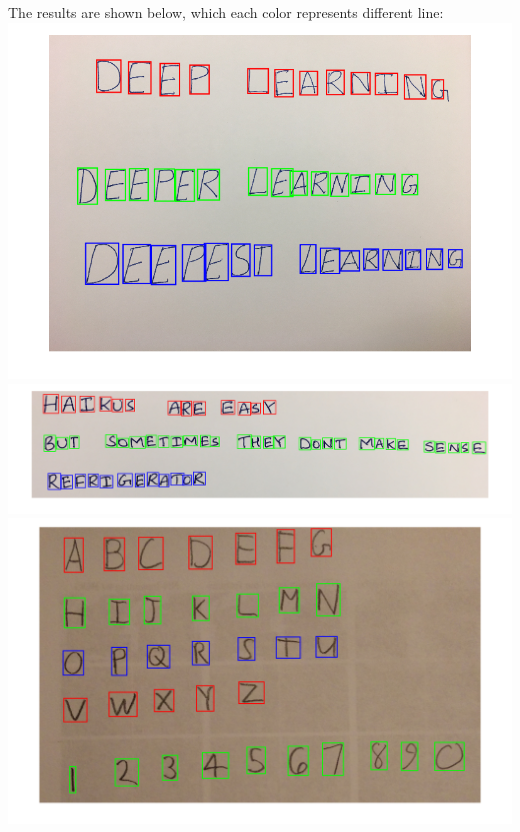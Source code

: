 \documentclass[12pt,letterpaper,boxed]{hmcpset}
\begin{document}
\begin{solution}
The results are shown below, which each color represents different line:\\
\includegraphics[width=\textwidth]{4_3_1.png}\\
\includegraphics[width=\textwidth]{4_3_2.png}\\
\includegraphics[width=\textwidth]{4_3_3.png}\\

\end{solution}
\end{document}
